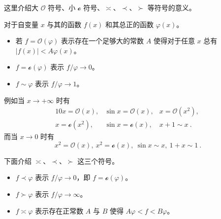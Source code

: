 
这里介绍大 $\mathcal O$ 符号、小 $\mathcal o$ 符号、$\asymp$、$\prec$、$\succ$ 等符号的意义。

对于自变量 $x$ 与其的函数 $f(x)$ 和其总正的函数 $\varphi(x)$。
\begin{itemize}
\item 若 $f=\mathcal O(\varphi)$ 表示存在一个足够大的常数 $A$ 使得对于任意 $x$ 总有 $|f(x)| < A \varphi(x)$。
\item $f = \mathcal o(\varphi)$ 表示 $f/\varphi \rightarrow 0$。
\item $f \sim \varphi$ 表示 $f / \varphi \rightarrow 1$。
\end{itemize}

例如当 $x \rightarrow +\infty$ 时有
\begin{equation}
\begin{matrix}
10x = \mathcal O(x), &\sin x = \mathcal O(x), &x = \mathcal O(x^2), ~\\
x = \mathcal o(x^2), &\sin x = \mathcal o(x), &x + 1 \sim x ~.
\end{matrix}
\end{equation}
而当 $x \rightarrow 0$ 时有
\begin{equation}
x^2 = \mathcal O(x), ~ x^2 = \mathcal o(x), ~ \sin x \sim x , ~ 1+x \sim 1 ~.
\end{equation}

下面介绍 $\asymp$、$\prec$、$\succ$ 这三个符号。
\begin{itemize}
\item $f \prec \varphi$ 表示 $f/\varphi \rightarrow 0$，即 $f = \mathcal o(\varphi)$。
\item $f \succ \varphi$ 表示 $f/\varphi \rightarrow \infty$。
\item $f \asymp \varphi$ 表示存在正常数 $A$ 与 $B$ 使得 $A\varphi < f < B \varphi$。
\end{itemize}
